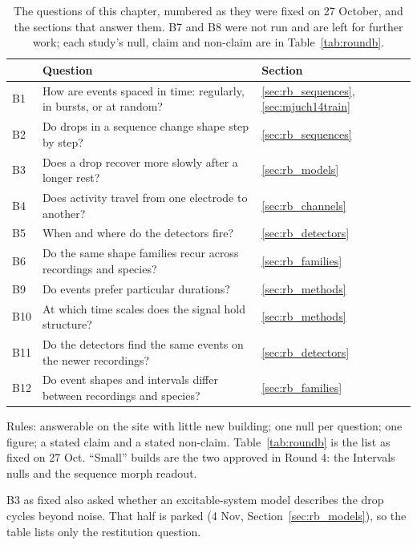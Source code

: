 \begin{table}[H]
\caption[{The questions of this chapter.}]{The questions of this chapter, numbered as they were fixed on 27 October, and the sections that answer them. B7 and B8 were not run and are left for further work; each study's null, claim and non-claim are in Table~\ref{tab:roundb}.}
\label{tab:rbquestions}
\small
\begin{tabularx}{\textwidth}{@{}l X l@{}}
\toprule
 & \textbf{Question} & \textbf{Section}\\
\midrule
B1 & How are events spaced in time: regularly, in bursts, or at random? & \ref{sec:rb_sequences}, \ref{sec:mjuch14train}\\
B2 & Do drops in a sequence change shape step by step? & \ref{sec:rb_sequences}\\
B3 & Does a drop recover more slowly after a longer rest? & \ref{sec:rb_models}\\
B4 & Does activity travel from one electrode to another? & \ref{sec:rb_channels}\\
B5 & When and where do the detectors fire? & \ref{sec:rb_detectors}\\
B6 & Do the same shape families recur across recordings and species? & \ref{sec:rb_families}\\
B9 & Do events prefer particular durations? & \ref{sec:rb_methods}\\
B10 & At which time scales does the signal hold structure? & \ref{sec:rb_methods}\\
B11 & Do the detectors find the same events on the newer recordings? & \ref{sec:rb_detectors}\\
B12 & Do event shapes and intervals differ between recordings and species? & \ref{sec:rb_families}\\
\bottomrule
\end{tabularx}
\end{table}


\begin{instructions}
Rules: answerable on the site with little new building; one null per question; one figure; a stated claim and a
stated non-claim. Table~\ref{tab:roundb} is the list as fixed on 27 Oct. ``Small'' builds are the two approved in
Round 4: the Intervals nulls and the sequence morph readout.

B3 as fixed also asked whether an excitable-system model describes the drop cycles beyond noise. That half is parked
(4 Nov, Section~\ref{sec:rb_models}), so the table lists only the restitution question.
\end{instructions}

